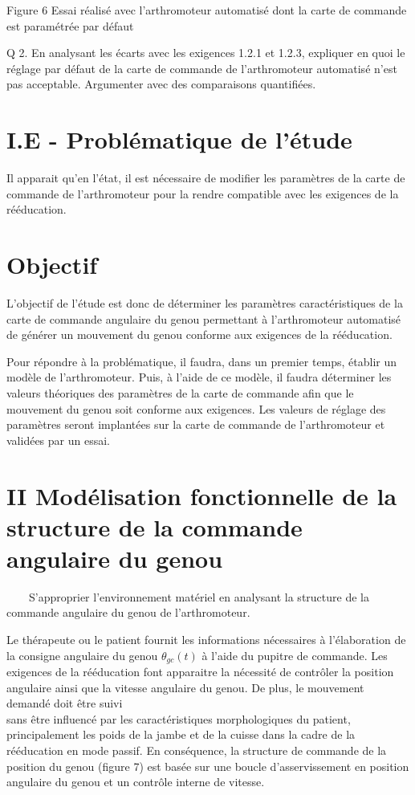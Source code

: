 \documentclass[10pt]{article}
\begin{document}
Figure 6 Essai réalisé avec l'arthromoteur automatisé dont la carte de commande est paramétrée par défaut

Q 2. En analysant les écarts avec les exigences 1.2.1 et 1.2.3, expliquer en quoi le réglage par défaut de la carte de commande de l'arthromoteur automatisé n'est pas acceptable. Argumenter avec des comparaisons quantifiées.

\section*{I.E - Problématique de l'étude}
Il apparait qu'en l'état, il est nécessaire de modifier les paramètres de la carte de commande de l'arthromoteur pour la rendre compatible avec les exigences de la rééducation.

\section*{Objectif}
L'objectif de l'étude est donc de déterminer les paramètres caractéristiques de la carte de commande angulaire du genou permettant à l'arthromoteur automatisé de générer un mouvement du genou conforme aux exigences de la rééducation.

Pour répondre à la problématique, il faudra, dans un premier temps, établir un modèle de l'arthromoteur. Puis, à l'aide de ce modèle, il faudra déterminer les valeurs théoriques des paramètres de la carte de commande afin que le mouvement du genou soit conforme aux exigences. Les valeurs de réglage des paramètres seront implantées sur la carte de commande de l'arthromoteur et validées par un essai.

\section*{II Modélisation fonctionnelle de la structure de la commande angulaire du genou}
 $\qquad$S'approprier l'environnement matériel en analysant la structure de la commande angulaire du genou de l'arthromoteur.

Le thérapeute ou le patient fournit les informations nécessaires à l'élaboration de la consigne angulaire du genou $\theta_{g c}(t)$ à l'aide du pupitre de commande. Les exigences de la rééducation font apparaitre la nécessité de contrôler la position angulaire ainsi que la vitesse angulaire du genou. De plus, le mouvement demandé doit être suivi\\
sans être influencé par les caractéristiques morphologiques du patient, principalement les poids de la jambe et de la cuisse dans la cadre de la rééducation en mode passif. En conséquence, la structure de commande de la position du genou (figure 7) est basée sur une boucle d'asservissement en position angulaire du genou et un contrôle interne de vitesse.
\end{document}
